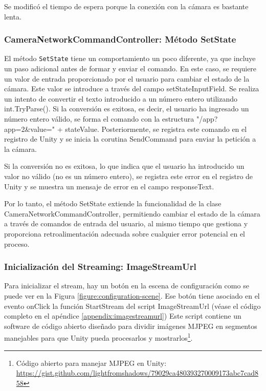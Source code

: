 Se modificó el tiempo de espera porque la conexión con la cámara es bastante lenta.

\subsubsection{CameraNetworkCommandController: Método SetState}

El método \lstinline{SetState} tiene un comportamiento un poco diferente, ya que incluye un paso adicional antes de formar y enviar el comando. En este caso, se requiere un valor de entrada proporcionado por el usuario para cambiar el estado de la cámara. Este valor se introduce a través del campo setStateInputField. Se realiza un intento de convertir el texto introducido a un número entero utilizando int.TryParse(). Si la conversión es exitosa, es decir, el usuario ha ingresado un número entero válido, se forma el comando con la estructura "/app?app=2\&value=" + stateValue. Posteriormente, se registra este comando en el registro de Unity y se inicia la corutina SendCommand para enviar la petición a la cámara.



Si la conversión no es exitosa, lo que indica que el usuario ha introducido un valor no válido (no es un número entero), se registra este error en el registro de Unity y se muestra un mensaje de error en el campo responseText.



Por lo tanto, el método SetState extiende la funcionalidad de la clase CameraNetworkCommandController, permitiendo cambiar el estado de la cámara a través de comandos de entrada del usuario, al mismo tiempo que gestiona y proporciona retroalimentación adecuada sobre cualquier error potencial en el proceso.


\subsubsection{Inicialización del Streaming: ImageStreamUrl}
Para inicializar el stream, hay un botón en la escena de configuración como se puede ver en la Figura \ref{figure:configuration-scene}. Ese botón tiene asociado en el evento onClick la función StartStream del script ImageStreamUrl (véase el código completo en el apéndice \ref{appendix:imagestreamurl}) Este script contiene un software de código abierto diseñado para dividir imágenes MJPEG en segmentos manejables para que Unity pueda procesarlos y mostrarlos\footnote{Código abierto para manejar MJPEG en Unity: \url{https://gist.github.com/lightfromshadows/79029ca480393270009173abc7cad858}}.


